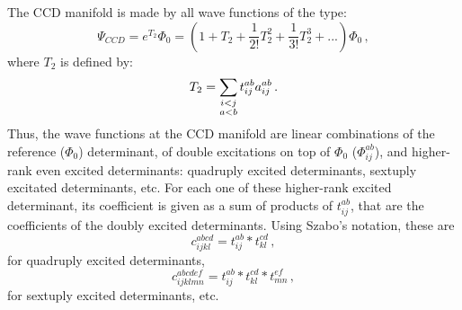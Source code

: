 The CCD manifold is made by all wave functions of the type:
\begin{equation}
  \Psi_{CCD} = e^{T_2} \Phi_0 = (1 + T_2 + \frac{1}{2!}T_2^2 + \frac{1}{3!}T_2^3 + ...) \Phi_0\,,
\end{equation}
where $T_2$ is defined by:
\begin{equation}
  T_2 = \sum_{\mathclap{\substack{
        i<j\\
        a<b}}} t_{ij}^{ab} a_{ij}^{ab}\,.
\end{equation}
Thus, the wave functions at the CCD manifold are linear combinations of the reference ($\Phi_0$) determinant,
of double excitations on top of $\Phi_0$ ($\Phi_{ij}^{ab}$), and higher-rank even excited determinants:
quadruply excited determinants, sextuply excitated determinants, etc.
For each one of these higher-rank excited determinant, its coefficient is given as a sum of products
of $t_{ij}^{ab}$, that are the coefficients of the doubly excited determinants.
Using Szabo's notation, these are
\begin{equation}
  c_{ijkl}^{abcd} = t_{ij}^{ab} * t_{kl}^{cd}\,,
\end{equation}
for quadruply excited determinants,
\begin{equation}
  c_{ijklmn}^{abcdef} = t_{ij}^{ab} * t_{kl}^{cd} * t_{mn}^{ef}\,,
\end{equation}
for sextuply excited determinants, etc.


